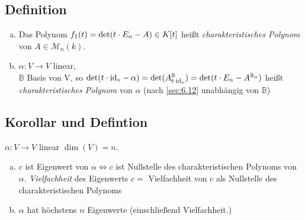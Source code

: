 \subsection{Definition}\label{sec:\thesubsection}
\begin{enumerate}[a)]
\item Das Polynom $f_1(t) = \det(t \cdot E_n -A) \in K[t]$ hei\ss t \emph{charakteristisches Polynom} von $A \in \mathcal{M}_n(k)$.
\item $\alpha : V \to V$ linear,\\
$\mathbb{B}$ Basis von V, so $\det(t \cdot \mathrm{id}_v - \alpha) = \det(A^{\mathbb{B}}_{t \cdot \mathrm{id}_v}) = \det(t \cdot E_n - A^{\mathbb{B}_\alpha})$ hei\ss t \emph{charakteristisches Polynom} von $\alpha$ (nach \ref{sec:6.12} unabhängig von $\mathbb{B}$)
\end{enumerate}
\subsection{Korollar und Defintion}\label{sec:\thesubsection}
$\alpha : V \to  V$ linear $\dim(V) = n$.
\begin{enumerate}[a)]
\item $c$ ist Eigenwert von $\alpha \Leftrightarrow c $ ist Nullstelle des charakteristischen Polynoms von $\alpha$. \emph{Vielfachheit} des Eigenwerts $c = $ Vielfachheit von $c$ als Nullstelle des charakteristischen Polynoms
\item $\alpha$ hat höchstens $n$ Eigenwerte (einschlie\ss end Vielfachheit.) 
\end{enumerate}
